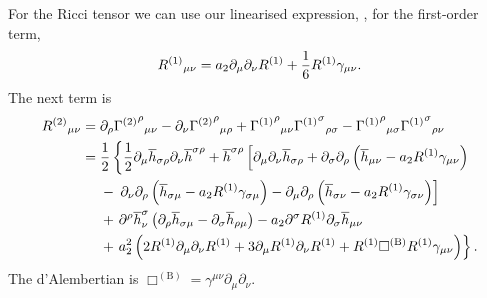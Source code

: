 For the Ricci tensor we can use our linearised expression, , for the first-order term,
\begin{equation}
{R^{(1)}}_{\mu\nu} = a_2\partial_\mu\partial_\nu R^{(1)} + \dfrac{1}{6} R^{(1)}\gamma_{\mu\nu}.
\end{equation}
The next term is
\begin{align}
{R^{(2)}}_{\mu\nu} = {} & \partial_\rho {{\Gamma^{(2)}}^\rho}_{\mu\nu} - \partial_\nu {{\Gamma^{(2)}}^\rho}_{\mu\rho} + {{\Gamma^{(1)}}^\rho}_{\mu\nu}{{\Gamma^{(1)}}^\sigma}_{\rho\sigma} - {{\Gamma^{(1)}}^\rho}_{\mu\sigma}{{\Gamma^{(1)}}^\sigma}_{\rho\nu} \nonumber \\
 = {} & \dfrac{1}{2}\left\{\recip{2}\partial_\mu\overline{h}_{\sigma\rho}\partial_\nu\overline{h}^{\sigma\rho} + \overline{h}^{\sigma\rho}\left[\partial_\mu\partial_\nu\overline{h}_{\sigma\rho} \vphantom{R^{(1)}} + \partial_\sigma\partial_\rho\left(\overline{h}_{\mu\nu} - a_2 R^{(1)}\gamma_{\mu\nu}\right) \right.\right. \nonumber \\*
  & - \left.\left. \partial_\nu\partial_\rho\left(\overline{h}_{\sigma\mu} \vphantom{R^{(1)}} - a_2 R^{(1)} \gamma_{\sigma\mu}\right) - \partial_\mu\partial_\rho\left(\overline{h}_{\sigma\nu} - a_2 R^{(1)} \gamma_{\sigma\nu}\right)\right] \right. \nonumber \\*
  & + \left. \partial^\rho\overline{h}^\sigma_\nu\left(\partial_\rho\overline{h}_{\sigma\mu} - \partial_\sigma\overline{h}_{\rho\mu}\right) - a_2 \partial^\sigma R^{(1)}\partial_\sigma\overline{h}_{\mu\nu} \right. \nonumber \\*
  & + \left. a_2^2 \left(2R^{(1)}\partial_\mu\partial_\nu R^{(1)} + 3\partial_\mu R^{(1)}\partial_\nu R^{(1)} + R^{(1)} \Box^{(\text{B})} R^{(1)} \gamma_{\mu\nu}\right)\right\}.
\end{align}
The d'Alembertian is $\Box^{(\text{B})} = \gamma^{\mu\nu}\partial_\mu\partial_\nu$.


